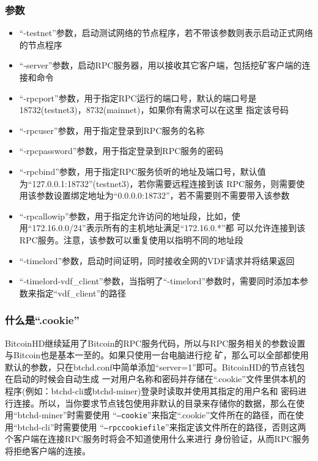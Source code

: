 \subsubsection{参数}
\begin{itemize}
    \item ``-testnet''参数，启动测试网络的节点程序，若不带该参数则表示启动正式网络的节点程序
    \item ``-server''参数，启动RPC服务器，用以接收其它客户端，包括挖矿客户端的连接和命令
    \item ``-rpcport''参数，用于指定RPC运行的端口号，默认的端口号是18732(testnet3)，8732(mainnet)，如果你有需求可以在这里
        指定该号码
    \item ``-rpcuser''参数，用于指定登录到RPC服务的名称
    \item ``-rpcpassword''参数，用于指定登录到RPC服务的密码
    \item ``-rpcbind''参数，用于指定RPC服务侦听的地址及端口号，默认值为``127.0.0.1:18732''(testnet3)，若你需要远程连接到该
        RPC服务，则需要使用该参数设置绑定地址为``0.0.0.0:18732''，若不需要则不需要带入该参数
    \item ``-rpcallowip''参数，用于指定允许访问的地址段，比如，使用``172.16.0.0/24''表示所有的主机地址满足``172.16.0.*''都
        可以允许连接到该RPC服务。注意，该参数可以重复使用以指明不同的地址段
    \item ``-timelord''参数，启动时间证明，同时接收全网的VDF请求并将结果返回
    \item ``-timelord-vdf\_client''参数，当指明了``-timelord''参数时，需要同时添加本参数来指定``vdf\_client''的路径
\end{itemize}
\subsubsection{什么是``.cookie''}
\begin{flushleft}
    BitcoinHD继续延用了Bitcoin的RPC服务代码，所以与RPC服务相关的参数设置与Bitcoin也是基本一至的。如果只使用一台电脑进行挖
    矿，那么可以全部都使用默认的参数，只在btchd.conf中简单添加``server=1''即可。BitcoinHD的节点钱包在启动的时候会自动生成
    一对用户名称和密码并存储在``.cookie''文件里供本机的程序(例如：btchd-cli或btchd-miner)登录时读取并使用其指定的用户名和
    密码进行连接。所以，当你要求节点钱包使用非默认的目录来存储你的数据，那么在使用``btchd-miner''时需要使用
    ``\texttt{--cookie}''来指定``.cookie''文件所在的路径，而在使用``btchd-cli''时需要使用
    ``\texttt{--rpccookiefile}''来指定该文件所在的路径，否则这两个客户端在连接RPC服务时将会不知道使用什么来进行
    身份验证，从而RPC服务将拒绝客户端的连接。
\end{flushleft}
